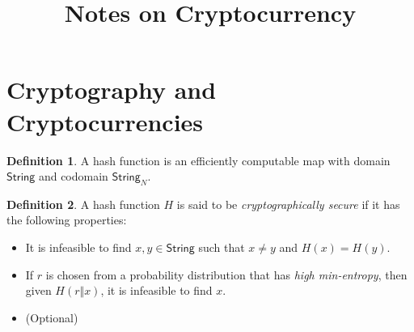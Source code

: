 \documentclass[12pt]{article}
\title{Notes on Cryptocurrency}
\author{}
\newcommand{\Str}{\mathsf{String}}
\theoremstyle{definition}
\newtheorem{definition}{Definition}[section]
\begin{document}
\maketitle
\tableofcontents
\newpage
\section{Cryptography and Cryptocurrencies}
\begin{definition}
	A hash function is an efficiently computable map with domain $\Str$ and codomain $\Str_{N}$.
\end{definition}
\begin{definition}
	A hash function $H$ is said to be \textit{cryptographically secure} if it has the following properties:
	\begin{itemize}
		\item It is infeasible to find $x, y \in \Str$ such that $x \neq y$ and $H(x) = H(y)$.
		\item If $r$ is chosen from a probability distribution that has \textit{high min-entropy}, then given $H(r \Vert x)$, it is infeasible to find $x$.
		\item (Optional) 
	\end{itemize}
\end{definition}
\end{document}
